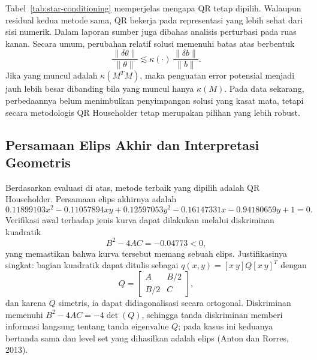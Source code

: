 \documentclass[12pt,a4paper]{article}
\begin{document}
\begin{table}[h]
\centering
\caption{Perbandingan stabilitas numerik antara Normal Equation dan QR Householder.}
\label{tab:star-conditioning}
\end{table}

Tabel~\ref{tab:star-conditioning} memperjelas mengapa QR tetap dipilih. Walaupun residual kedua metode sama, QR bekerja pada representasi yang lebih sehat dari sisi numerik. Dalam laporan sumber juga dibahas analisis perturbasi pada ruas kanan. Secara umum, perubahan relatif solusi memenuhi batas atas berbentuk
\[
\frac{\|\delta \theta\|}{\|\theta\|} \lesssim \kappa(\cdot)\,\frac{\|\delta b\|}{\|b\|}.
\]
Jika yang muncul adalah \(\kappa(M^TM)\), maka penguatan error potensial menjadi jauh lebih besar dibanding bila yang muncul hanya \(\kappa(M)\). Pada data sekarang, perbedaannya belum menimbulkan penyimpangan solusi yang kasat mata, tetapi secara metodologis QR Householder tetap merupakan pilihan yang lebih robust.

\subsection{Persamaan Elips Akhir dan Interpretasi Geometris}
Berdasarkan evaluasi di atas, metode terbaik yang dipilih adalah QR Householder. Persamaan elips akhirnya adalah
\[
0.11899103x^2 - 0.11057894xy + 0.12597053y^2 - 0.16147331x - 0.94180659y + 1 = 0.
\]
Verifikasi awal terhadap jenis kurva dapat dilakukan melalui diskriminan kuadratik
\[
B^2 - 4AC = -0.04773 < 0,
\]
yang memastikan bahwa kurva tersebut memang sebuah elips. Justifikasinya singkat: bagian kuadratik dapat ditulis sebagai \(q(x,y)=[x\ y]Q[x\ y]^T\) dengan
\[
Q=
\begin{bmatrix}
A & B/2\\
B/2 & C
\end{bmatrix},
\]
dan karena \(Q\) simetris, ia dapat didiagonalisasi secara ortogonal. Diskriminan memenuhi \(B^2-4AC=-4\det(Q)\), sehingga tanda diskriminan memberi informasi langsung tentang tanda eigenvalue \(Q\); pada kasus ini keduanya bertanda sama dan level set yang dihasilkan adalah elips (Anton dan Rorres, 2013).
\end{document}

